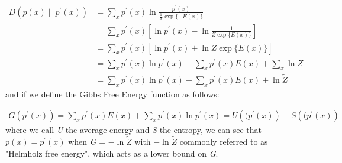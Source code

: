 \documentclass{article}
\begin{document}
\begin{equation} \label{KL_energy}
    \begin{aligned}
        \textit{D}\left(\textit{p}\left(\textit{x}\right)\mid\mid\textit{p}^{\prime}\left(\textit{x}\right) \right) & = 
        \sum_\textit{x}\textit{p}^{\prime}\left(\textit{x}\right)\ln\frac{\textit{p}^{\prime}\left(\textit{x}\right)}{\frac{1}{\textit{Z}}\exp\{-\textit{E}\left(\textit{x}\right)\}} & \\& = \sum_\textit{x}\textit{p}^{\prime}\left(\textit{x}\right)\left[\ln\textit{p}^{\prime}\left(\textit{x}\right) - \ln\frac{1}{\textit{Z}\exp\{\textit{E}\left(\textit{x}\right)\}}  \right] & \\& = \sum_\textit{x}\textit{p}^{\prime}\left(\textit{x}\right)\left[\ln\textit{p}^{\prime}\left(\textit{x}\right) + \ln\textit{Z}\exp\{\textit{E}\left(\textit{x}\right)\}  \right] & \\& =        \sum_\textit{x}\textit{p}^{\prime}\left(\textit{x}\right)\ln\textit{p}^{\prime}\left(\textit{x}\right) + \sum_\textit{x}\textit{p}^{\prime}\left(\textit{x}\right)\textit{E}\left(\textit{x}\right) +  \sum_\textit{x}\ln\textit{Z} & \\& =        \sum_\textit{x}\textit{p}^\prime\left(\textit{x}\right)\ln\textit{p}^\prime\left(\textit{x}\right) + \sum_\textit{x}\textit{p}^\prime\left(\textit{x}\right)\textit{E}\left(\textit{x}\right) + \ln\textit{$\tilde{Z}$} 
\end{aligned}
\end{equation} and if we define the Gibbs Free Energy function as follows:

\begin{equation} \label{Gibbs Free Energy}
    \begin{aligned}
        \textit{G}\left(\textit{p}^{\prime}\left(\textit{x}\right)\right) = \sum_\textit{x}\textit{p}^\prime\left(\textit{x}\right)\textit{E}\left(\textit{x}\right) + \sum_\textit{x}\textit{p}^\prime\left(\textit{x}\right)\ln\textit{p}^\prime\left(\textit{x}\right) = \textit{U}\left((\textit{p}^\prime\left(\textit{x}\right)\right) - \textit{S}\left((\textit{p}^\prime\left(\textit{x}\right)\right)
    \end{aligned}
\end{equation} where we call \textit{U} the average energy and \textit{S} the entropy, we can see that $\textit{p}\left(\textit{x}\right) = \textit{p}^\prime\left(\textit{x}\right)$ when \textit{G} = $-\ln\textit{$\tilde{Z}$}$ with $-\ln\textit{$\tilde{Z}$}$ commonly referred to as "Helmholz free energy", which acts as a lower bound on \textit{G}. 
\end{document}
